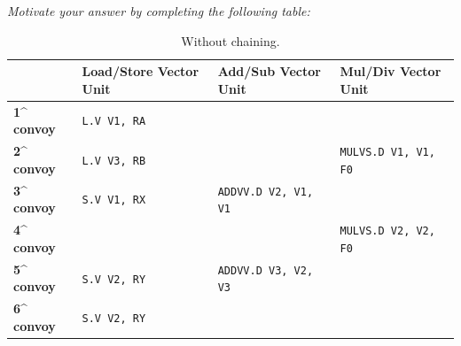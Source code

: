 \begin{enumerate}
    \emph{Motivate your answer by completing the following table:}
    \begin{table}[!htp]
        \centering
        \begin{adjustbox}{width={\textwidth},totalheight={\textheight},keepaspectratio}
            \begin{tabular}{@{} l | l | l | l @{}}
                \toprule
                & \textbf{Load/Store Vector Unit}    & \textbf{Add/Sub Vector Unit}   & \textbf{Mul/Div Vector Unit}   \\
                \midrule
                \textbf{1\textasciicircum \, convoy}    & \texttt{L.V V1, RA}       &                               &                               \\ [.3em]
                \textbf{2\textasciicircum \, convoy}    & \texttt{L.V V3, RB}       &                               & \texttt{MULVS.D V1, V1, F0}   \\ [.3em]
                \textbf{3\textasciicircum \, convoy}    & \texttt{S.V V1, RX}       & \texttt{ADDVV.D V2, V1, V1}   &                               \\ [.3em]
                \textbf{4\textasciicircum \, convoy}    &                           &                               & \texttt{MULVS.D V2, V2, F0}   \\ [.3em]
                \textbf{5\textasciicircum \, convoy}    & \texttt{S.V V2, RY}       & \texttt{ADDVV.D V3, V2, V3}   &                               \\ [.3em]
                \textbf{6\textasciicircum \, convoy}    & \texttt{S.V V2, RY}       &                               &                               \\
                \bottomrule
            \end{tabular}
        \end{adjustbox}
        \caption*{Without chaining.}
    \end{table}


\end{enumerate}
